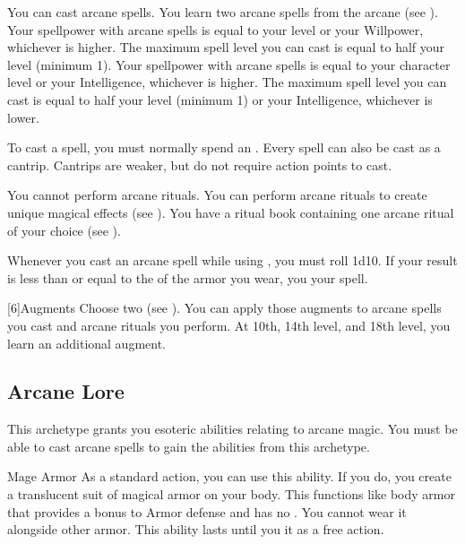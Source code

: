         You can cast arcane spells.
        You learn two arcane spells from the arcane  (see ).
         Your spellpower with arcane spells is equal to your level or your Willpower, whichever is higher.
        The maximum spell level you can cast is equal to half your level (minimum 1).
         Your spellpower with arcane spells is equal to your character level or your Intelligence, whichever is higher.
        The maximum spell level you can cast is equal to half your level (minimum 1) or your Intelligence, whichever is lower.

        To cast a spell, you must normally spend an .
        Every spell can also be cast as a cantrip.
        Cantrips are weaker, but do not require action points to cast.

         You cannot perform arcane rituals.
         You can perform arcane rituals to create unique magical effects (see ).
        You have a ritual book containing one arcane ritual of your choice (see ).

        Whenever you cast an arcane spell while using , you must roll 1d10.
        If your result is less than or equal to the  of the armor you wear, you  your spell.

        [6]{Augments}
        Choose two  (see ).
        You can apply those augments to arcane spells you cast and arcane rituals you perform.
        At 10th, 14th level, and 18th level, you learn an additional augment.

    \subsection{Arcane Lore}
        This archetype grants you esoteric abilities relating to arcane magic.
        You must be able to cast arcane spells to gain the abilities from this archetype.

        \begin{ability}{Mage Armor}
            As a standard action, you can use this ability.
            If you do, you create a translucent suit of magical armor on your body.
            This functions like body armor that provides a  bonus to Armor defense and has no .
            You cannot wear it alongside other armor.
            This ability lasts until you  it as a free action.
        \end{ability}

